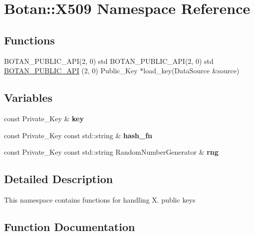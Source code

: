 \hypertarget{namespace_botan_1_1_x509}{}\section{Botan\+:\+:X509 Namespace Reference}
\label{namespace_botan_1_1_x509}
\subsection*{Functions}
\begin{DoxyCompactItemize}
\item 
B\+O\+T\+A\+N\+\_\+\+P\+U\+B\+L\+I\+C\+\_\+\+A\+PI(2, 0) std B\+O\+T\+A\+N\+\_\+\+P\+U\+B\+L\+I\+C\+\_\+\+A\+PI(2, 0) std \hyperlink{namespace_botan_1_1_x509_af5ed8fe1a15fe04e788faea89f386728}{B\+O\+T\+A\+N\+\_\+\+P\+U\+B\+L\+I\+C\+\_\+\+A\+PI} (2, 0) Public\+\_\+\+Key $\ast$load\+\_\+key(Data\+Source \&source)
\end{DoxyCompactItemize}
\subsection*{Variables}
\begin{DoxyCompactItemize}
\item 
\mbox{\label{namespace_botan_1_1_x509_a5966e109de2a0b2097e6150b998003f9}} 
const Private\+\_\+\+Key \& {\bfseries key}
\item 
\mbox{\label{namespace_botan_1_1_x509_aa3e6bc9a931d4d28c4ae1f5d4bd293b4}} 
const Private\+\_\+\+Key const std\+::string \& {\bfseries hash\+\_\+fn}
\item 
\mbox{\label{namespace_botan_1_1_x509_a3e023aac93d4b925c8051d200243db37}} 
const Private\+\_\+\+Key const std\+::string Random\+Number\+Generator \& {\bfseries rng}
\end{DoxyCompactItemize}


\subsection{Detailed Description}
This namespace contains functions for handling X. public keys 

\subsection{Function Documentation}
\mbox{\label{namespace_botan_1_1_x509_af5ed8fe1a15fe04e788faea89f386728}} 

